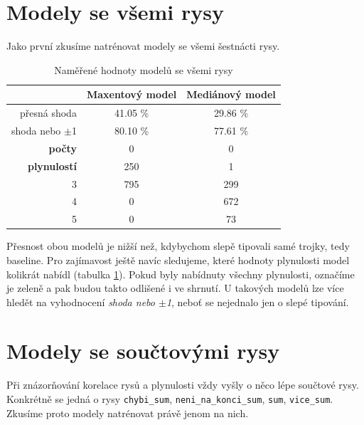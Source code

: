 \documentclass[12pt,a4paper]{report}
\begin{document}


\section{Modely se všemi rysy}
Jako první zkusíme natrénovat modely se všemi šestnácti rysy.

\begin{table}[!htbp]
\begin{center}
\begin{tabular}{|r|c|c|}
\hline
 & \textbf{Maxentový model} & \textbf{Mediánový model} \\
 \hline
přesná shoda & 41.05 \%  & 29.86 \%  \\
\hline
shoda nebo $\pm$1 & 80.10 \% & 77.61 \%  \\
\hline
\textbf{počty} \quad 1 & \color{red}0 & \color{red}0 \\
\textbf{plynulostí} \quad 2 & 250 & 1 \\
 3 & 795 & 299 \\
 4 & \color{red}0 & 672 \\
 5 & \color{red}0 & 73 \\
\hline
\end{tabular}
\caption{Naměřené hodnoty modelů se všemi rysy}\label{tb:all}
\end{center}
\end{table}

Přesnost obou modelů je nižší než, kdybychom slepě tipovali samé trojky, tedy baseline. Pro zajímavost ještě navíc sledujeme, které hodnoty plynulosti model kolikrát nabídl (tabulka \ref{tb:all}). Pokud byly nabídnuty všechny plynulosti, označíme je zeleně a pak budou takto odlišené i ve shrnutí. U takových modelů lze více hledět na vyhodnocení \textit{shoda nebo $\pm$1}, neboť se nejednalo jen o slepé tipování.


\section{Modely se součtovými rysy}
Při znázorňování korelace rysů a plynulosti vždy vyšly o něco lépe součtové rysy. Konkrétně se jedná o rysy \texttt{chybi\_sum}, \texttt{neni\_na\_konci\_sum}, \texttt{sum}, \texttt{vice\_sum}. Zkusíme proto modely natrénovat právě jenom na nich. 
\end{document}
